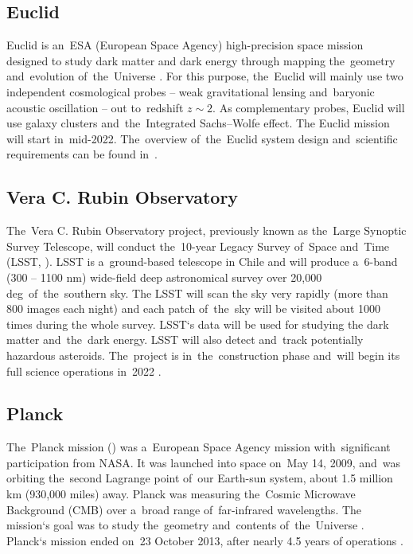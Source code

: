 \subsection{Euclid}
Euclid is an~ESA (European Space Agency) high-precision space mission designed to study dark matter and dark energy through mapping the~geometry and~evolution of~the~Universe \parencite{euclid,2010arXiv1001.0061R}. For this purpose, the~Euclid will mainly use two independent cosmological probes -- weak gravitational lensing and~baryonic acoustic oscillation -- out to~redshift $z\sim2$. As complementary probes, Euclid will use galaxy clusters and~the~Integrated Sachs--Wolfe effect. The Euclid mission will start in~mid-2022. The~overview of~the~Euclid system design and~scientific requirements can be found in~\cite{2011arXiv1110.3193L}.
\subsection{Vera C. Rubin Observatory}
The~Vera C. Rubin Observatory project, previously known as the~Large Synoptic Survey Telescope, will conduct the~10-year Legacy Survey of~Space and~Time (LSST, \cite{lsst}). LSST is a~ground-based telescope in Chile and will produce a~6-band (300 -- 1100 nm) wide-field deep astronomical survey over 20,000 deg\sq\ of~the~southern sky. The LSST will scan the sky very rapidly (more than 800 images each night) and each patch of~the~sky will be visited about 1000 times during the whole survey. LSST`s data will be used for studying the dark matter and~the~dark energy. LSST will also detect and~track potentially hazardous asteroids. The~project is in~the~construction phase and~will begin its full science operations in~2022 \parencite{lsst_web}.
\subsection{Planck}
The~Planck mission (\cite{planck}) was a~European Space Agency mission with~significant participation from NASA. It was launched into space on~May 14, 2009, and~was orbiting the~second Lagrange point of~our Earth-sun system, about 1.5 million km (930,000 miles) away. Planck was measuring the~Cosmic Microwave Background (CMB) over a~broad range of~far-infrared wavelengths. The mission`s goal was to study the~geometry and~contents of~the~Universe \parencite[for results, see][]{planck_cosm}. Planck`s mission ended on~23 October 2013, after nearly 4.5 years of operations \parencite{planck_web}.
